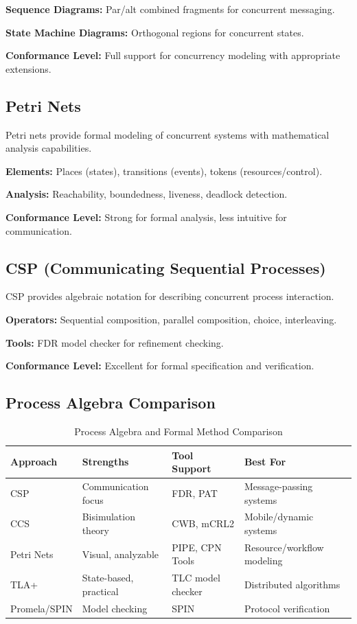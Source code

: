 \documentclass[11pt,letterpaper]{article}
\begin{document}
\textbf{Sequence Diagrams:} Par/alt combined fragments for concurrent messaging.

\textbf{State Machine Diagrams:} Orthogonal regions for concurrent states.

\textbf{Conformance Level:} Full support for concurrency modeling with appropriate extensions.

\subsection{Petri Nets}

Petri nets provide formal modeling of concurrent systems with mathematical analysis capabilities.

\textbf{Elements:} Places (states), transitions (events), tokens (resources/control).

\textbf{Analysis:} Reachability, boundedness, liveness, deadlock detection.

\textbf{Conformance Level:} Strong for formal analysis, less intuitive for communication.

\subsection{CSP (Communicating Sequential Processes)}

CSP provides algebraic notation for describing concurrent process interaction.

\textbf{Operators:} Sequential composition, parallel composition, choice, interleaving.

\textbf{Tools:} FDR model checker for refinement checking.

\textbf{Conformance Level:} Excellent for formal specification and verification.

\subsection{Process Algebra Comparison}

\begin{table}[H]
\centering
\caption{Process Algebra and Formal Method Comparison}
\small
\begin{tabular}{@{}L{2.5cm}L{3.5cm}L{3.5cm}L{3.5cm}@{}}
\toprule
\textbf{Approach} & \textbf{Strengths} & \textbf{Tool Support} & \textbf{Best For} \\
\midrule
CSP & Communication focus & FDR, PAT & Message-passing systems \\
\addlinespace
CCS & Bisimulation theory & CWB, mCRL2 & Mobile/dynamic systems \\
\addlinespace
Petri Nets & Visual, analyzable & PIPE, CPN Tools & Resource/workflow modeling \\
\addlinespace
TLA+ & State-based, practical & TLC model checker & Distributed algorithms \\
\addlinespace
Promela/SPIN & Model checking & SPIN & Protocol verification \\
\bottomrule
\end{tabular}
\end{table}
\end{document}
